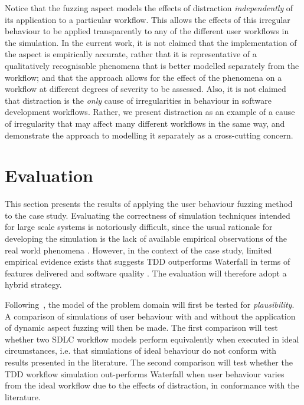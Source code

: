 \documentclass{llncs}
\begin{document}
Notice that the fuzzing aspect models the effects of distraction \emph{independently} of its application to a particular
workflow.  This allows the effects of this irregular behaviour to be applied transparently to any of the different
user workflows in the simulation. In the current work, it is not claimed that the implementation of the aspect is
empirically accurate, rather that it is representative of a qualitatively recognisable phenomena that is better modelled
separately from the workflow; and that the approach allows for the effect of the phenomena on a workflow at different
degrees of severity to be assessed.  Also, it is not claimed that distraction is the \emph{only} cause of irregularities in
behaviour in software development workflows.  Rather, we present distraction as an example of a cause of irregularity
that may affect many different workflows in the same way, and demonstrate the approach to modelling it separately as a
cross-cutting concern.
 

\section{Evaluation}
\label{sec:evaluation}


This section presents the results of applying the user behaviour fuzzing method to the case study. Evaluating the
correctness of simulation techniques intended for large scale systems is notoriously difficult, since the usual
rationale for developing the simulation is the lack of available empirical observations of the real world phenomena
\cite{naylor67verification}. However, in the context of the case study, limited empirical evidence exists that suggests
TDD outperforms Waterfall in terms of features delivered and software quality
\citep{Bhat2006TestDrivenDevelopment,George2004TestDrivenDevelopment,Huang2009EmpiricalTestFirstProgramming}. The
evaluation will therefore adopt a hybrid strategy.

Following~\citet{naylor67verification}, the model of the problem domain will first be tested for \emph{plausibility}.  A
comparison of simulations of user behaviour with and without the application of dynamic aspect fuzzing will then be
made.  The first comparison will test whether two SDLC workflow models perform equivalently when executed in ideal
circumstances, i.e. that simulations of ideal behaviour do not conform with results presented in the literature. The
second comparison will test whether the TDD workflow simulation out-performs Waterfall when user behaviour varies from
the ideal workflow due to the effects of distraction, in conformance with the literature.
\end{document}
